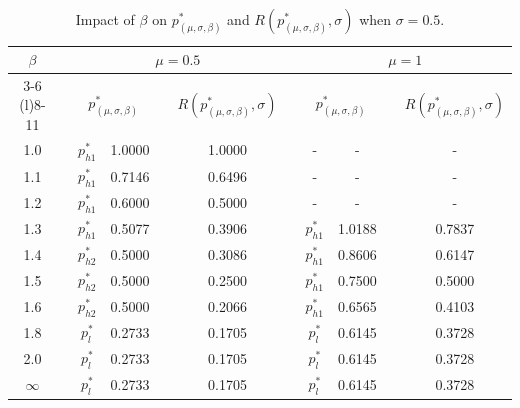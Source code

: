 \documentclass[11pt]{article}
\newcommand{\1}{\mathds{1}}
\begin{document}
\begin{table}[]
\centering
\begin{tabular}{@{}ccccccccccc@{}}
\toprule
\multicolumn{1}{c}{\multirow{2}{*}{$\beta$}} & \multicolumn{1}{c}{} & \multicolumn{4}{c}{$\mu = 0.5$} & \multicolumn{1}{c}{} & \multicolumn{4}{c}{$\mu = 1$} \\ \cmidrule(lr){3-6} \cmidrule(l){8-11} 
\multicolumn{1}{c}{} & \multicolumn{1}{c}{} & \multicolumn{2}{c}{$p^*_{(\mu,\sigma,\beta)}$} & \multicolumn{1}{c}{} & \multicolumn{1}{c}{$R(p^*_{(\mu,\sigma,\beta)},\sigma)$} & \multicolumn{1}{c}{} & \multicolumn{2}{c}{$p^*_{(\mu,\sigma,\beta)}$} & \multicolumn{1}{c}{} & \multicolumn{1}{c}{$R(p^*_{(\mu,\sigma,\beta)},\sigma)$} \\ \midrule
1.0 &  & $p^*_{h1}$ & 1.0000 &  & 1.0000 &  & - & - &  & - \\
1.1 &  & $p^*_{h1}$ & 0.7146 &  & 0.6496 &  & - & - &  & - \\
1.2 &  & $p^*_{h1}$ & 0.6000 &  & 0.5000 &  & - & - &  & - \\
1.3 &  & $p^*_{h1}$ & 0.5077 &  & 0.3906 &  & $p^*_{h1}$ & 1.0188 &  & 0.7837 \\
1.4 &  & $p^*_{h2}$ & 0.5000 &  & 0.3086 &  & $p^*_{h1}$ & 0.8606 &  & 0.6147 \\
1.5 &  & $p^*_{h2}$ & 0.5000 &  & 0.2500 &  & $p^*_{h1}$ & 0.7500 &  & 0.5000 \\
1.6 &  & $p^*_{h2}$ & 0.5000 &  & 0.2066 &  & $p^*_{h1}$ & 0.6565 &  & 0.4103 \\
1.8 &  & $p^*_l$ & 0.2733 &  & 0.1705 &  & $p^*_l$ & 0.6145 &  & 0.3728 \\
2.0 &  & $p^*_l$ & 0.2733 &  & 0.1705 &  & $p^*_l$ & 0.6145 &  & 0.3728 \\
$\infty$ &  & $p^*_l$ & 0.2733 &  & 0.1705 &  & $p^*_l$ & 0.6145 &  & 0.3728 \\ \bottomrule
\end{tabular}
\caption{Impact of $\beta$ on $p^*_{(\mu,\sigma,\beta)}$ and $R(p^*_{(\mu,\sigma,\beta)},\sigma)$ when $\sigma = 0.5$.}\label{tabbb2}
\end{table}
\end{document}
